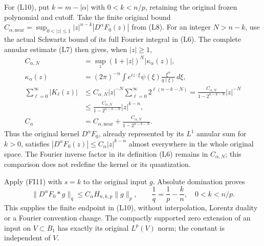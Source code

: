 \documentclass[
  11pt,
]{article}
\begin{document}
For (L10), put \(k=m-|\alpha|\) with \(0<k<n/p\), retaining the original
frozen polynomial and cutoff. Take the finite original bound
\(C_{\alpha,\mathrm{near}}=\sup_{0<|z|\leq1}|z|^{n-k}|D^\alpha F_0(z)|\)
from (L8). For an integer \(N>n-k\), use the actual Schwartz bound of
its full Fourier integral in (L6). The complete annular estimate (L7)
then gives, when \(|z|\geq1\), \[
 \begin{split}
 C_{\alpha,N}&=\sup_z(1+|z|)^N|\kappa_\alpha(z)|,\\
 \kappa_\alpha(z)&=(2\pi)^{-n}
       \int e^{iz\cdot\xi}\psi(\xi)\frac{\xi^\alpha}{q(\xi)}\,d\xi,\\
 \sum_{\ell=0}^\infty|K_\ell(z)|
 &\leq C_{\alpha,N}|z|^{-N}
                  \sum_{\ell=0}^\infty2^{\ell(n-k-N)}
   =\frac{C_{\alpha,N}}{1-2^{n-k-N}}|z|^{-N}\\
 &\leq\frac{C_{\alpha,N}}{1-2^{n-k-N}}|z|^{k-n},\\
 C_\alpha&=C_{\alpha,\mathrm{near}}
                  +\frac{C_{\alpha,N}}{1-2^{n-k-N}} .
 \end{split}                                                   \tag{FI16}
\] Thus the original kernel \(D^\alpha F_0\), already represented by its
\(L^1\) annular sum for \(k>0\), satisfies
\(|D^\alpha F_0(z)|\leq C_\alpha|z|^{k-n}\) almost everywhere in the
whole original space. The Fourier inverse factor in its definition (L6)
remains in \(C_{\alpha,N}\); this comparison does not redefine the
kernel or its quantization.

Apply (FI11) with \(s=k\) to the original input \(g\). Absolute
domination proves \[
 \|D^\alpha F_0*g\|_q
 \leq C_\alpha H_{n,k,p}\|g\|_p,\qquad
       \frac1q=\frac1p-\frac kn,\quad 0<k<n/p.                \tag{FI17}
\] This supplies the finite endpoint in (L10), without interpolation,
Lorentz duality or a Fourier convention change. The compactly supported
zero extension of an input on \(V\subset B_1\) has exactly its original
\(L^p(V)\) norm; the constant is independent of \(V\).
\end{document}
